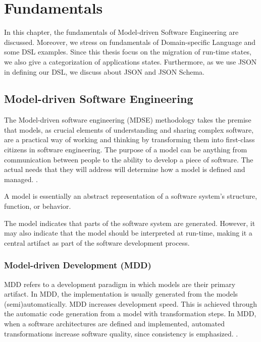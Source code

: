 \chapter{Fundamentals}
\label{ch:fundamentals}
In this chapter, the fundamentals of Model-driven Software Engineering are discussed. Moreover, we stress on fundamentals of Domain-specific Language and some DSL examples. Since this thesis focus on the migration of run-time states, we also give a categorization of applications states. Furthermore, as we use JSON in defining our DSL, we discuss about JSON and JSON Schema.

\section{Model-driven Software Engineering}
The Model-driven software engineering (MDSE) methodology takes the premise that models, as crucial elements of understanding and sharing complex software, are a practical way of working and thinking by transforming them into first-class citizens in software engineering. The purpose of a model can be anything from communication between people to the ability to develop a piece of software. The actual needs that they will address will determine how a model is defined and managed. \cite{mdse}. 

\begin{definition}
A model is essentially an abstract representation of a software system’s structure, function, or behavior. 
\end{definition}

The model indicates that parts of the software system are generated. However, it may also indicate that the model should be interpreted at run-time, making it a central artifact as part of the software development process.

\subsection{Model-driven Development (MDD)}
MDD refers to a development paradigm in which models are their primary artifact. In MDD, the implementation is usually generated from the models (semi)automatically\cite{mdse}. MDD increases development speed. This is achieved through the automatic code generation from a model with transformation steps. In MDD, when a software architectures are defined and implemented, automated transformations increase software quality, since consistency is emphasized\cite{mdsd_en}.
.

